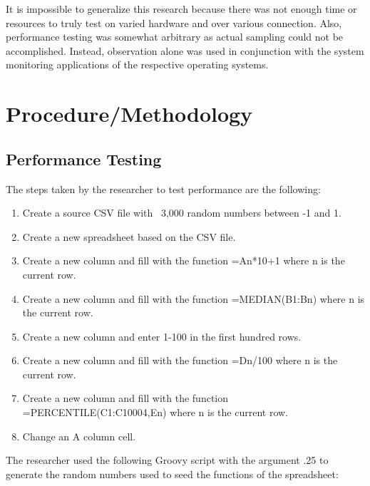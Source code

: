 \documentclass[12pt,oneside,letterpaper,titlepage]{article}
\begin{document}
It is impossible to generalize this research because there was not enough time
or resources to truly test on varied hardware and over various connection.
Also, performance testing was somewhat arbitrary as actual sampling could not be
accomplished.  Instead, observation alone was used in conjunction with the
system monitoring applications of the respective operating systems.

\section{Procedure/Methodology}

\subsection{Performance Testing}


The steps taken by the researcher to test performance are the following:

\begin{enumerate}

\item Create a source CSV file with ~3,000 random numbers between -1 and 1.

\item Create a new spreadsheet based on the CSV file.

\item Create a new column and fill with the function =An*10+1 where n is the
  current row.

\item Create a new column and fill with the function =MEDIAN(B1:Bn) where n is
  the current row.

\item Create a new column and enter 1-100 in the first hundred rows.

\item Create a new column and fill with the function =Dn/100 where n is the
  current row.

\item Create a new column and fill with the function =PERCENTILE(C1:C10004,En)
  where n is the current row.

\item Change an A column cell.

\end{enumerate}

The researcher used the following Groovy script with the argument .25 to
generate the random numbers used to seed the functions of the spreadsheet:
\end{document}
